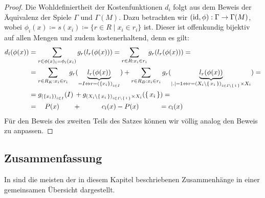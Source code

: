 \begin{proof}
	Die Wohldefiniertheit der Kostenfunktionen $d_i$ folgt aus dem Beweis der Äquivalenz der Spiele $\Gamma$ und $\Gamma(M)$. Dazu betrachten wir $(\mathrm{id}, \phi): \Gamma \to \Gamma(M)$, wobei $\phi_i(x) \coloneqq s(x_i) \coloneqq \{r \in R \mid x_i \in r_i\}$ ist. Dieser ist offenkundig bijektiv auf allen Mengen und zudem kostenerhaltend, denn es gilt:
	\begin{align*}
		d_{\hat{\imath}}(\phi(x)) 	&=\sum_{r \in \phi(x)_{\hat{\imath}} = \phi_{\hat{\imath}}(x_{\hat{\imath}})} g_r(l_r(\phi(x))) = \sum_{r \in R: x_{\hat{\imath}} \in r_{\hat{\imath}}} g_r(l_r(\phi(x))) = \\
		&=\sum_{r \in R_K: x_{\hat{\imath}} \in r_{\hat{\imath}}} g_r(\underbrace{l_r(\phi(x))}_{= I \Leftrightarrow r = \left(\{x_i\}\right)_{i \in I}}) + \sum_{r \in R_D: x_{\hat{\imath}} \in r_i} g_r(\underbrace{l_r(\phi(x))}_{\left|.\right|=1 \Leftrightarrow r = \left(X_i\setminus\set{x_i}\right)_{i \in I\setminus\set{\hat{\imath}}} \times X_{\hat{\imath}}}) = \\
		&=g_{\left(\{x_i\}\right)_{i \in I}}(I) \,+ g_{\left(X_i\setminus\set{x_i}\right)_{i \in I\setminus\set{\hat{\imath}}} \times X_{\hat{\imath}}}(\set{x_{\hat{\imath}}}) = \\
		&=\quad P(x) \quad\quad + \quad\quad\quad c_{\hat{\imath}}(x) - P(x) \quad\quad\quad = c_{\hat{\imath}}(x) 
	\end{align*}
	Für den Beweis des zweiten Teils des Satzes können wir völlig analog den Beweis zu  anpassen.
\end{proof}


\subsection{Zusammenfassung}

In  sind die meisten der in diesem Kapitel beschriebenen Zusammenhänge in einer gemeinsamen Übersicht dargestellt.


